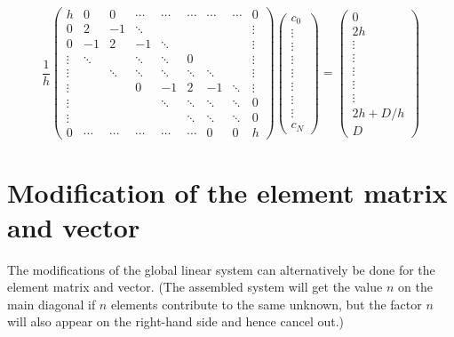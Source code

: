 \documentclass[../main.tex]{subfiles}
\begin{document}
		\begin{equation}
			\label{eqa185}	
			\frac{1}{h}\left(\begin{array}{ccccccccc}
				h & 0 & 0 & \cdots & \cdots & \cdots & \cdots & \cdots & 0 \\
				0 & 2 & -1 & \ddots & & & & & \vdots \\
				0 & -1 & 2 & -1 & \ddots & & & & \vdots \\
				\vdots & \ddots & & \ddots & \ddots & 0 & & & \vdots \\
				\vdots & & \ddots & \ddots & \ddots & \ddots & \ddots & & \vdots \\
				\vdots & & & 0 & -1 & 2 & -1 & \ddots & \vdots \\
				\vdots & & & & \ddots & \ddots & \ddots & \ddots & 0 \\
				\vdots & & & & & \ddots & \ddots & \ddots & 0 \\
				0 & \cdots & \cdots & \cdots & \cdots & \cdots & 0 & 0 & h
			\end{array}\right)\left(\begin{array}{c}
				c_{0} \\
				\vdots \\
				\vdots \\
				\vdots \\
				\vdots \\
				\vdots \\
				\vdots \\
				\vdots \\
				c_{N}
			\end{array}\right)=\left(\begin{array}{c}
				0 \\
				2 h \\
				\vdots \\
				\vdots \\
				\vdots \\
				\vdots \\
				\vdots \\
				2 h + D/h \\
				D
			\end{array}\right)
		\end{equation}
	\bigbreak
	\section[Modification of the element matrix and vector]{Modification of the element matrix and vector}
		\noindent The modifications of the global linear system can alternatively be done for the element matrix and vector. (The assembled system will get the value $n$ on the main diagonal if $n$ elements contribute to the same unknown, but the factor $n$ will also appear on the right-hand side and hence cancel out.)
		
\end{document}
